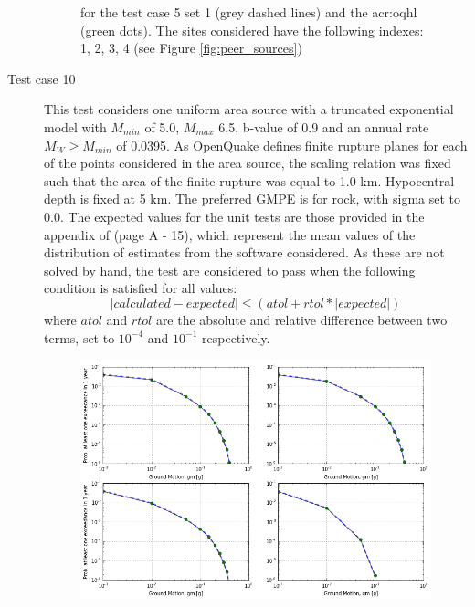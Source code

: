 \begin{description}
\begin{figure}[!ht]
{for the test case 5 set 1 (grey dashed lines) and the \gls{acr:oqhl} 
(green dots). The sites considered have the following indexes: 
1, 2, 3, 4 (see Figure \ref{fig:peer_sources})}
\label{fig:peer_set1_test5}
\end{figure}
    \clearpage
    \item [Test case 10]
        This test considers one uniform area source with a truncated exponential 
        model with $M_{min}$ of 5.0, $M_{max}$ 6.5, b-value of 0.9 and an annual 
        rate $M_W \geq M_{min}$ of 0.0395. As OpenQuake defines finite rupture 
        planes for each of the points considered in the area source, the scaling
        relation was fixed such that the area of the finite rupture was equal to 
        1.0 km. Hypocentral depth is fixed at 5 km. 
        The preferred GMPE is \cite{sadigh1997} for rock, with sigma set to 0.0. 
        The expected values for the unit tests are those provided in the appendix 
        of \cite{thomas2010} (page A - 15), which represent the mean values of the 
        distribution of estimates from the software considered. 
        As these are not solved by hand, the test are considered to pass when the 
        following condition is satisfied for all values:
        \begin{equation}
        |calculated - expected| \leq \left( {atol + rtol * |expected|} \right)
        \end{equation}
        where $atol$ and $rtol$ are the absolute and relative difference 
        between two terms, set to $10^{-4}$ and $10^{-1}$ respectively.
\begin{figure}[!ht]
\centering
\includegraphics[width=14cm]{./Pictures/qa/test10_set1.png}

\end{figure}
\end{description}
